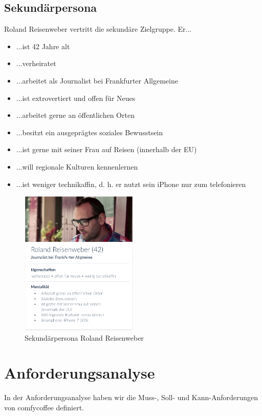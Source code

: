 \subsection{Sekundärpersona}
Roland Reisenweber vertritt die sekundäre Zielgruppe. Er...
\begin{itemize}
	\item ...ist 42 Jahre alt
	\item ...verheiratet
	\item ...arbeitet als Journalist bei Frankfurter Allgemeine
	\item ...ist extrovertiert und offen für Neues
	\item ...arbeitet gerne an öffentlichen Orten
	\item ...besitzt ein ausgeprägtes soziales Bewusstsein
	\item ...ist gerne mit seiner Frau auf Reisen (innerhalb der EU)
	\item ...will regionale Kulturen kennenlernen
	\item ...ist weniger technikaffin, d. h. er nutzt sein iPhone nur zum telefonieren
\end{itemize}

\begin{figure}[H]
    \centering
		\includegraphics[width=0.5\textwidth]{Bilder/roland.eps}
		\caption{Sekundärpersona Roland Reisenweber}
\end{figure}

\section{Anforderungsanalyse}
In der Anforderungsanalyse haben wir die Muss-, Soll- und Kann-Anforderungen von comfycoffee definiert.

